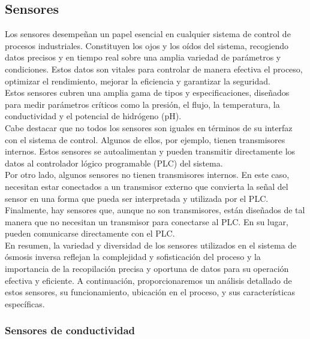 

\subsection{Sensores}

Los sensores desempeñan un papel esencial en cualquier sistema de control de procesos industriales.
Constituyen los ojos y los oídos del sistema, recogiendo datos precisos y en tiempo real sobre una amplia variedad de
parámetros y condiciones. Estos datos son vitales para controlar de manera efectiva el proceso, optimizar el rendimiento,
mejorar la eficiencia y garantizar la seguridad.\\

Estos sensores cubren una amplia gama de tipos y especificaciones, diseñados para medir parámetros
críticos como la presión, el flujo, la temperatura, la conductividad y el potencial de hidrógeno (pH).\\

Cabe destacar que no todos los sensores son iguales en términos de su interfaz con el sistema de control. Algunos de ellos,
por ejemplo, tienen transmisores internos. Estos sensores se autoalimentan y pueden transmitir directamente los datos al
controlador lógico programable (PLC) del sistema.\\

Por otro lado, algunos sensores no tienen transmisores internos. En este caso, necesitan estar conectados a un transmisor
externo que convierta la señal del sensor en una forma que pueda ser interpretada y utilizada por el PLC.\\

Finalmente, hay sensores que, aunque no son transmisores, están diseñados de tal manera que no necesitan un transmisor para
conectarse al PLC. En su lugar, pueden comunicarse directamente con el PLC.\\

En resumen, la variedad y diversidad de los sensores utilizados en el sistema de ósmosis inversa reflejan la complejidad
y sofisticación del proceso y la importancia de la recopilación precisa y oportuna de datos para su operación efectiva
y eficiente. A continuación, proporcionaremos un análisis detallado de estos sensores, su funcionamiento, ubicación
en el proceso, y sus características específicas.\\

\subsubsection{Sensores de conductividad} \label{sec:sesor_conductividad}

